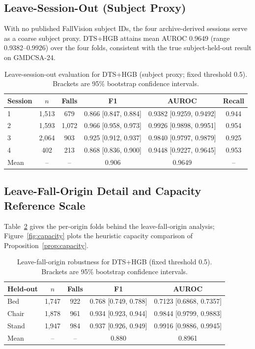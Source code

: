 \subsection{Leave-Session-Out (Subject Proxy)}
With no published FallVision subject IDs, the four archive-derived sessions serve as a coarse subject proxy. DTS+HGB attains mean AUROC 0.9649 (range 0.9382--0.9926) over the four folds, consistent with the true subject-held-out result on GMDCSA-24.

\begin{table}[h]
\centering
\small
\begin{tabular}{lccccc}
\toprule
Session & $n$ & Falls & F1 & AUROC & Recall \\
\midrule
1 & 1,513 & 679 & 0.866 [0.847, 0.884] & 0.9382 [0.9259, 0.9492] & 0.944 \\
2 & 1,593 & 1,072 & 0.966 [0.958, 0.973] & 0.9926 [0.9898, 0.9951] & 0.954 \\
3 & 2,064 & 903 & 0.925 [0.912, 0.937] & 0.9840 [0.9797, 0.9879] & 0.925 \\
4 & 402 & 213 & 0.868 [0.836, 0.900] & 0.9448 [0.9227, 0.9645] & 0.953 \\
\midrule
Mean & -- & -- & 0.906 & 0.9649 & -- \\
\bottomrule
\end{tabular}
\caption{Leave-session-out evaluation for DTS+HGB (subject proxy; fixed threshold 0.5). Brackets are 95\% bootstrap confidence intervals.}
\label{tab:lso}
\end{table}

\subsection{Leave-Fall-Origin Detail and Capacity Reference Scale}
Table~\ref{tab:lfo} gives the per-origin folds behind the leave-fall-origin analysis; Figure~\ref{fig:capacity} plots the heuristic capacity comparison of Proposition~\ref{prop:capacity}.
\begin{table}[h]
\centering
\small
\begin{tabular}{lcccc}
\toprule
Held-out & $n$ & Falls & F1 & AUROC \\
\midrule
Bed & 1,747 & 922 & 0.768 [0.749, 0.788] & 0.7123 [0.6868, 0.7357] \\
Chair & 1,878 & 961 & 0.934 [0.923, 0.944] & 0.9844 [0.9799, 0.9883] \\
Stand & 1,947 & 984 & 0.937 [0.926, 0.949] & 0.9916 [0.9886, 0.9945] \\
\midrule
Mean & -- & -- & 0.880 & 0.8961 \\
\bottomrule
\end{tabular}
\caption{Leave-fall-origin robustness for DTS+HGB (fixed threshold 0.5). Brackets are 95\% bootstrap confidence intervals.}
\label{tab:lfo}
\end{table}

